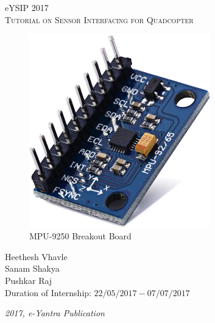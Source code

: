\documentclass[a4paper,12pt,oneside]{book}
\begin{document}
\begin{titlepage}
\raggedright
{\Large eYSIP 2017\\[1cm]}
{\Huge \scshape Tutorial on Sensor Interfacing for Quadcopter \\[.1in]}

\vfill

\begin{figure}[!htb]
\centering
\includegraphics[width=0.7\textwidth]{images/mpu-9250-breakout}
\\MPU-9250 Breakout Board
\end{figure}

\vfill

\begin{flushright}
{\large Heethesh Vhavle \\}
{\large Sanam Shakya \\}
{\large Pushkar Raj \\}
\vspace{0.5cm}
{\large Duration of Internship: $ 22/05/2017-07/07/2017 $ \\}
\end{flushright}
\medskip

{\itshape 2017, e-Yantra Publication}
\end{titlepage}



\end{document}
